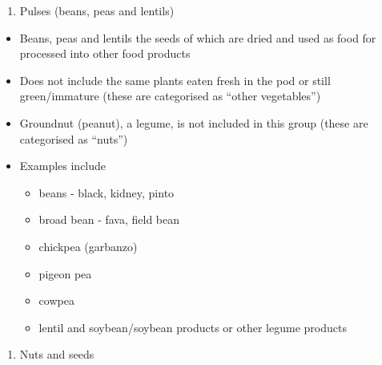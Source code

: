 \documentclass[12pt,]{book}
\providecommand{\tightlist}{%
  \setlength{\itemsep}{0pt}\setlength{\parskip}{0pt}}
\theoremstyle{definition}
\theoremstyle{definition}
\theoremstyle{definition}
\theoremstyle{remark}
\begin{document}
\begin{enumerate}
\def\labelenumi{\arabic{enumi}.}
\setcounter{enumi}{1}
\tightlist
\item
  Pulses (beans, peas and lentils)
\end{enumerate}

\begin{itemize}
\tightlist
\item
  Beans, peas and lentils the seeds of which are dried and used as food
  for processed into other food products
\item
  Does not include the same plants eaten fresh in the pod or still
  green/immature (these are categorised as ``other vegetables'')
\item
  Groundnut (peanut), a legume, is not included in this group (these are
  categorised as ``nuts'')
\item
  Examples include

  \begin{itemize}
  \tightlist
  \item
    beans - black, kidney, pinto
  \item
    broad bean - fava, field bean
  \item
    chickpea (garbanzo)
  \item
    pigeon pea
  \item
    cowpea
  \item
    lentil and soybean/soybean products or other legume products
  \end{itemize}
\end{itemize}

\begin{enumerate}
\def\labelenumi{\arabic{enumi}.}
\setcounter{enumi}{2}
\tightlist
\item
  Nuts and seeds
\end{enumerate}
\end{document}
